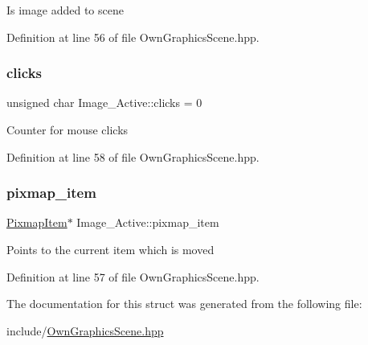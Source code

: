 Is image added to scene 

Definition at line 56 of file Own\+Graphics\+Scene.\+hpp.

\mbox{\label{structImage__Active_abb039226daf0372a8d88c842f5eb140f}} 
\subsubsection{\texorpdfstring{clicks}{clicks}}
{\footnotesize\ttfamily unsigned char Image\+\_\+\+Active\+::clicks = 0}

Counter for mouse clicks 

Definition at line 58 of file Own\+Graphics\+Scene.\+hpp.

\mbox{\label{structImage__Active_aa007ea3c9ba4830bbc2706af51820c20}} 
\subsubsection{\texorpdfstring{pixmap\+\_\+item}{pixmap\_item}}
{\footnotesize\ttfamily \mbox{\hyperlink{classPixmapItem}{Pixmap\+Item}}$\ast$ Image\+\_\+\+Active\+::pixmap\+\_\+item}

Points to the current item which is moved 

Definition at line 57 of file Own\+Graphics\+Scene.\+hpp.



The documentation for this struct was generated from the following file\+:\begin{DoxyCompactItemize}
\item 
include/\mbox{\hyperlink{OwnGraphicsScene_8hpp}{Own\+Graphics\+Scene.\+hpp}}\end{DoxyCompactItemize}
